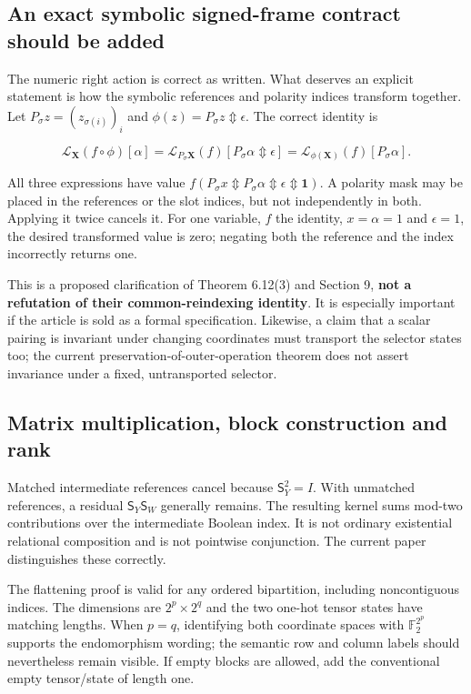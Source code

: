 \documentclass[
  10pt,
]{article}
\begin{document}
\subsection{An exact symbolic signed-frame contract should be
added}\label{an-exact-symbolic-signed-frame-contract-should-be-added}

The numeric right action is correct as written. What deserves an
explicit statement is how the symbolic references and polarity indices
transform together. Let \(P_\sigma z=(z_{\sigma(i)})_i\) and
\(\phi(z)=P_\sigma z\Updownarrow\epsilon\). The correct identity is

\[
\boxed{
\mathcal L_{\mathbf X}(f\circ\phi)[\alpha]
=\mathcal L_{P_\sigma\mathbf X}(f)
      [P_\sigma\alpha\Updownarrow\epsilon]
=\mathcal L_{\phi(\mathbf X)}(f)[P_\sigma\alpha].
}
\]

All three expressions have value
\(f(P_\sigma x\Updownarrow P_\sigma\alpha\Updownarrow\epsilon\Updownarrow\mathbf1)\).
A polarity mask may be placed in the references or the slot indices, but
not independently in both. Applying it twice cancels it. For one
variable, \(f\) the identity, \(x=\alpha=1\) and \(\epsilon=1\), the
desired transformed value is zero; negating both the reference and the
index incorrectly returns one.

This is a proposed clarification of Theorem 6.12(3) and Section 9,
\textbf{not a refutation of their common-reindexing identity}. It is
especially important if the article is sold as a formal specification.
Likewise, a claim that a scalar pairing is invariant under changing
coordinates must transport the selector states too; the current
preservation-of-outer-operation theorem does not assert invariance under
a fixed, untransported selector.

\subsection{Matrix multiplication, block construction and
rank}\label{matrix-multiplication-block-construction-and-rank}

Matched intermediate references cancel because \(\mathsf S_Y^2=I\). With
unmatched references, a residual \(\mathsf S_Y\mathsf S_W\) generally
remains. The resulting kernel sums mod-two contributions over the
intermediate Boolean index. It is not ordinary existential relational
composition and is not pointwise conjunction. The current paper
distinguishes these correctly.

The flattening proof is valid for any ordered bipartition, including
noncontiguous indices. The dimensions are \(2^p\times2^q\) and the two
one-hot tensor states have matching lengths. When \(p=q\), identifying
both coordinate spaces with \(\mathbb F_2^{2^p}\) supports the
endomorphism wording; the semantic row and column labels should
nevertheless remain visible. If empty blocks are allowed, add the
conventional empty tensor/state of length one.
\end{document}
